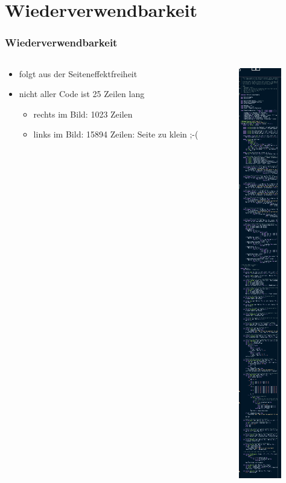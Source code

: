 \documentclass{beamer}
\begin{document}
\section{Wiederverwendbarkeit}

\begin{frame}
    \frametitle{Wiederverwendbarkeit}
    \begin{columns}[c]
        \begin{column}{.7\textwidth}
            \begin{itemize}
                \item folgt aus der Seiteneffektfreiheit
                \item nicht aller Code ist 25 Zeilen lang
                \begin{itemize}
                    \item rechts im Bild: 1023 Zeilen
                    \item links im Bild: 15894 Zeilen: Seite zu klein ;-(
                \end{itemize}
            \end{itemize}
        \end{column}
        \begin{column}{.3\textwidth}
            \begin{center}
                \includegraphics[scale=0.4]{long_code.png}
            \end{center}
        \end{column}
    \end{columns}
\end{frame}
\end{document}
